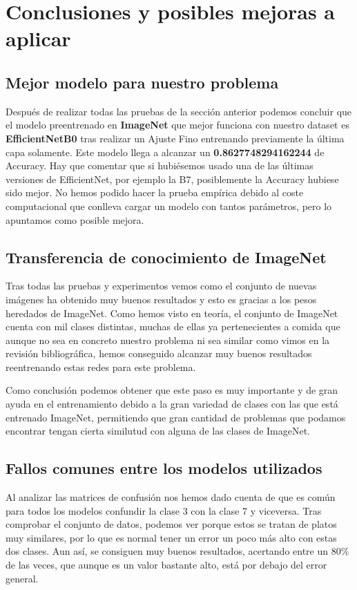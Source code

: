 \section{Conclusiones y posibles mejoras a aplicar}

\subsection{Mejor modelo para nuestro problema}

Después de realizar todas las pruebas de la sección anterior podemos concluir que el modelo preentrenado en \textbf{ImageNet} que mejor funciona con nuestro dataset es \textbf{EfficientNetB0} tras realizar un Ajuste Fino entrenando previamente la última capa solamente. Este modelo llega a alcanzar un \textbf{0.8627748294162244} de Accuracy. Hay que comentar que si hubiésemos usado una de las últimas versiones de EfficientNet, por ejemplo la B7, posiblemente la Accuracy hubiese sido mejor. No hemos podido hacer la prueba empírica debido al coste computacional que conlleva cargar un modelo con tantos parámetros, pero lo apuntamos como posible mejora.

\subsection{Transferencia de conocimiento de ImageNet}

Tras todas las pruebas y experimentos vemos como el conjunto de nuevas imágenes ha obtenido muy buenos resultados y esto es gracias a los pesos heredados de ImageNet. Como hemos visto en teoría, el conjunto de ImageNet cuenta con mil clases distintas, muchas de ellas ya pertenecientes a comida que aunque no sea en concreto nuestro problema ni sea similar como vimos en la revisión bibliográfica, hemos conseguido alcanzar muy buenos resultados reentrenando estas redes para este problema.

Como conclusión podemos obtener que este paso es muy importante y de gran ayuda en el entrenamiento debido a la gran variedad de clases con las que está entrenado ImageNet, permitiendo que gran cantidad de problemas que podamos encontrar tengan cierta similutud con alguna de las clases de ImageNet.


\subsection{Fallos comunes entre los modelos utilizados}

Al analizar las matrices de confusión nos hemos dado cuenta de que es común para todos los modelos confundir la clase 3 con la clase 7 y viceversa. Tras comprobar el conjunto de datos, podemos ver porque estos se tratan de platos muy similares, por lo que es normal tener un error un poco más alto con estas dos clases. Aun así, se consiguen muy buenos resultados, acertando entre un 80\% de las veces, que aunque es un valor bastante alto, está por debajo del error general.


